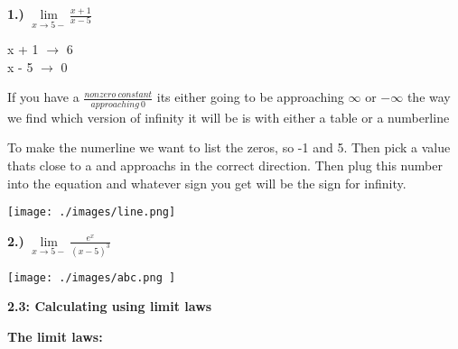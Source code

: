 \documentclass{report}
\begin{document}
    \bigbreak \noindent 
    \begin{large}
       \textbf{1.)} $\lim\limits_{x \to 5-}{ \frac{x+1}{x-5}}$ 
    \end{large}
    
    \bigbreak \noindent \bigbreak \noindent 
    \begin{center}
        \begin{large}
            x + 1 $\longrightarrow$ 6 \\
            x - 5 $\longrightarrow$ 0 
        \end{large}
    \end{center}

    \bigbreak 
    \begin{large}
        If you have a $ \frac{nonzero\ constant}{approaching\ 0} $ 
        its either going to be approaching $\infty$ or $-\infty$ the way we find which version of infinity
        it will be is with either a table or a numberline
    \end{large}
    
    \bigbreak 
    To make the numerline we want to list the zeros, so -1 and 5. Then pick a value thats close to a
    and approachs in the correct direction. Then plug this number into the equation and whatever sign you get
    will be the sign for infinity.
    \bigbreak \noindent 
    \begin{center}
        \texttt{[image: ./images/line.png]}
    \end{center}
    
    \bigbreak \noindent \bigbreak \noindent  
    \begin{large}
        \textbf{2.)} $\lim\limits_{x \to 5-}{ \frac{e^x}{ \left(x-5\right)^3}}$ 
    \end{large}

    \bigbreak \noindent 
    \begin{center}
       \texttt{[image:  ./images/abc.png ]} 
    \end{center}
    
   \pagebreak
   \begin{Large}
      \noindent \textbf{2.3: Calculating using limit laws} 
    \end{Large}
  
    \bigbreak \noindent \bigbreak \noindent 
    \begin{large}
        \begin{center}
            \textbf{The limit laws:} 
        \end{center}
    \end{large}
   
\end{document}
